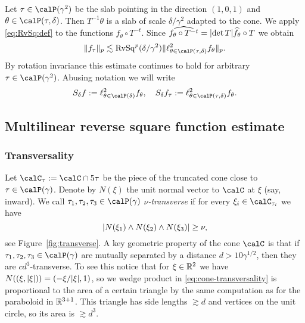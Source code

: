 Let $\tau \in \Part{\gamma^{2}}$ be the slab pointing in the direction $(1,0,1)$ and $\theta\in\Part[\tau]{\delta}$.
Then $T^{-1}\theta$ is a slab of scale $\delta/\gamma^{2}$ adapted to the cone.
We apply \eqref{eq:RvSq:def} to the functions $f_{\theta} \circ T^{-t}$.
Since $\widehat{f_{\theta} \circ T^{-t}} = \abs{\det T} \widehat{f_{\theta}} \circ T$ we obtain
\begin{equation}
\label{eq:RvSq:scaling}
\norm{f_{\tau}}_{p}
\lesssim
\RvSq^{p}(\delta/\gamma^{2}) \norm{\ell^{2}_{\theta \in \Part[\tau]{\delta}} f_{\theta}}_{p}.
\end{equation}
By rotation invariance this estimate continues to hold for arbitrary $\tau \in \Part{\gamma^{2}}$.
Abusing notation we will write
\[
S_{\delta}f := \ell^{2}_{\theta\in\Part{\delta}} f_{\theta},
\quad
S_{\delta}f_{\tau} := \ell^{2}_{\theta\in\Part[\tau]{\delta}} f_{\theta}.
\]

\subsection{Multilinear reverse square function estimate}

\subsubsection{Transversality}
Let $\calC_{\tau} := \calC \cap 5 \tau$ be the piece of the truncated cone close to $\tau \in \Part{\gamma}$.
Denote by $N(\xi)$ the unit normal vector to $\calC$ at $\xi$ (say, inward).
We call $\tau_{1},\tau_{2},\tau_{3} \in \Part{\gamma}$ \emph{$\nu$-transverse} if for every $\xi_{i} \in \calC_{\tau_{i}}$ we have
\begin{equation}
\label{eq:cone-transversality}
\lvert N(\xi_{1}) \wedge N(\xi_{2}) \wedge N(\xi_{3}) \rvert \geq \nu,
\end{equation}
see Figure~\ref{fig:transverse}.
A key geometric property of the cone $\calC$ is that if $\tau_1, \tau_2, \tau_3 \in \Part{\gamma}$ are mutually separated by a distance $d > 10 \gamma^{1/2}$, then they are $cd^{3}$-transverse.
To see this notice that for $\xi\in\mathbb{R}^{2}$ we have $N((\xi,{\lvert\xi\rvert}))=(-\xi/\lvert\xi\rvert,1)$, so we wedge product in \eqref{eq:cone-transversality} is proportional to the area of a certain triangle by the same computation as for the paraboloid in $\mathbb{R}^{3+1}$.
This triangle has side lengths $\gtrsim d$ and vertices on the unit circle, so its area is $\gtrsim d^{3}$.

